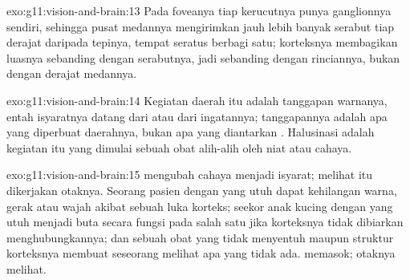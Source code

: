 \begin{solution}{exo:g11:vision-and-brain:13}
Pada foveanya tiap kerucutnya punya  ganglionnya sendiri, sehingga
pusat medannya mengirimkan jauh lebih banyak serabut tiap derajat
daripada tepinya, tempat seratus  berbagi satu; korteksnya
membagikan luasnya sebanding dengan serabutnya, jadi sebanding dengan
rinciannya, bukan dengan derajat medannya.
\end{solution}

\begin{solution}{exo:g11:vision-and-brain:14}
Kegiatan daerah itu adalah tanggapan warnanya, entah isyaratnya datang
dari  atau dari ingatannya; tanggapannya adalah apa yang
diperbuat daerahnya, bukan apa yang diantarkan . Halusinasi
adalah kegiatan itu yang dimulai sebuah obat alih-alih oleh niat atau cahaya.
\end{solution}

\begin{solution}{exo:g11:vision-and-brain:15}
 mengubah cahaya menjadi isyarat; melihat itu dikerjakan otaknya.
Seorang pasien dengan  yang utuh dapat kehilangan warna, gerak atau
wajah akibat sebuah luka korteks; seekor anak kucing dengan  yang
utuh menjadi buta secara fungsi pada salah satu  jika korteksnya
tidak dibiarkan menghubungkannya; dan sebuah obat yang tidak menyentuh
 maupun struktur korteksnya membuat seseorang melihat apa yang
tidak ada.  memasok; otaknya melihat.
\end{solution}

